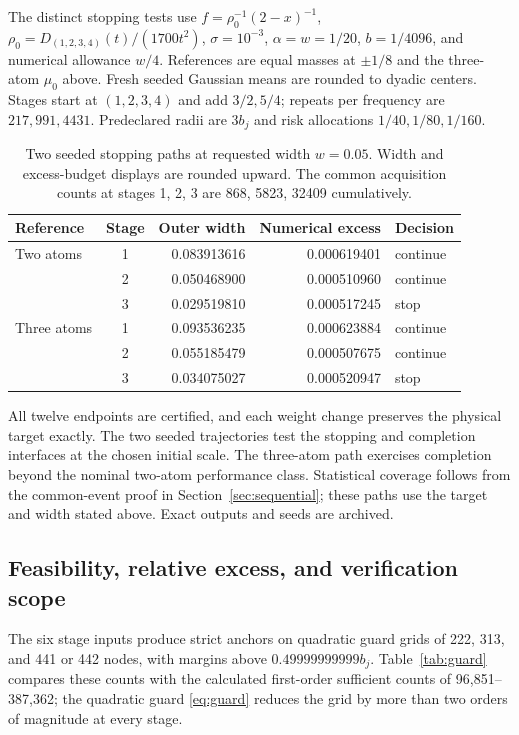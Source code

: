 \documentclass[10pt]{amsart}
\theoremstyle{definition}
\theoremstyle{remark}
\theoremstyle{plain}
\begin{document}
The distinct stopping tests use $f=\rho_0^{-1}(2-x)^{-1}$, $\rho_0=D_{(1,2,3,4)}(t)/(1700t^2)$, $\sigma=10^{-3}$, $\alpha=w=1/20$, $b=1/4096$, and numerical allowance $w/4$. References are equal masses at $\pm1/8$ and the three-atom $\mu_0$ above. Fresh seeded Gaussian means are rounded to dyadic centers. Stages start at $(1,2,3,4)$ and add $3/2,5/4$; repeats per frequency are $217,991,4431$. Predeclared radii are $3b_j$ and risk allocations $1/40,1/80,1/160$.
\begin{table}[tb]
\centering
\caption{Two seeded stopping paths at requested width $w=0.05$. Width and excess-budget displays are rounded upward. The common acquisition counts at stages 1, 2, 3 are 868, 5823, 32409 cumulatively.}\label{tab:stopping}
\begin{tabular}{lcrrl}\toprule
Reference & Stage & Outer width & Numerical excess & Decision\\\midrule
Two atoms & 1 & 0.083913616 & 0.000619401 & continue\\
 & 2 & 0.050468900 & 0.000510960 & continue\\
 & 3 & 0.029519810 & 0.000517245 & stop\\
Three atoms & 1 & 0.093536235 & 0.000623884 & continue\\
 & 2 & 0.055185479 & 0.000507675 & continue\\
 & 3 & 0.034075027 & 0.000520947 & stop\\
\bottomrule\end{tabular}
\end{table}

All twelve endpoints are certified, and each weight change preserves the physical target exactly. The two seeded trajectories test the stopping and completion interfaces at the chosen initial scale. The three-atom path exercises completion beyond the nominal two-atom performance class. Statistical coverage follows from the common-event proof in Section~\ref{sec:sequential}; these paths use the target and width stated above. Exact outputs and seeds are archived.

\subsection{Feasibility, relative excess, and verification scope}
The six stage inputs produce strict anchors on quadratic guard grids of 222, 313, and 441 or 442 nodes, with margins above $0.49999999999b_j$. Table~\ref{tab:guard} compares these counts with the calculated first-order sufficient counts of 96,851--387,362; the quadratic guard \eqref{eq:guard} reduces the grid by more than two orders of magnitude at every stage.
\end{document}
